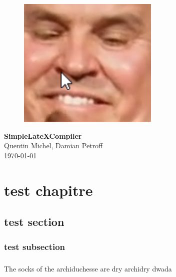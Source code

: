 \documentclass[a4paper,10pt,openany,oneside]{report}
\begin{document}
\begin{figure}
\centering
\vspace*{1cm}
\includegraphics[width=0.6\textwidth]{img/example.png}
\end{figure}
\vspace*{3cm}
\begin{center}
\textbf{\Huge{SimpleLateXCompiler}} \\[1cm]
{\Large Quentin Michel, Damian Petroff} \\[5cm]
\today
\end{center}
\tableofcontents
\chapter{test chapitre}
\section{test section}
\subsection{test subsection}
\paragraph{}
The socks of the archiduchesse are dry archidry
dwada
\end{document}
